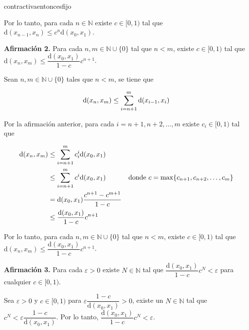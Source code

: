 \documentclass[12pt]{article}
\newenvironment{ejercicio}[1]{\begin{ejer}[breakable, pad at break = 5mm, leftrule = 0.7mm, rightrule = 0.7mm, right = 2mm, left = 2mm, enlarge bottom finally by = 3mm, fontlower = \setlength{\parskip}{2mm}]{}{#1}}{\end{ejer}}
\newcommand{\nat}{\mathbb{N}}
\begin{document}
\begin{ejercicio}{contractivaentoncesfijo}
\begin{minipage}{0.98\linewidth}
			Por lo tanto, para cada $ n \in \nat $ existe $ c \in [0,1) $ tal que $ \mathrm{d} (x_{n-1}, x_n) \leq c^n \mathrm{d} (x_0, x_1) $.
		\end{minipage}

		\textbf{Afirmación 2.} Para cada $ n, m \in \nat \cup \lbrace 0 \rbrace $ tal que $ n < m $, existe $ c \in [0,1) $ tal que $ \mathrm{d} (x_n, x_m) \leq \dfrac{\mathrm{d} (x_0, x_1)}{1-c} c^{n+1} $. 

		\hfill \begin{minipage}{0.98\linewidth}
			\setlength{\parskip}{1mm}

			Sean $ n, m \in \nat \cup \lbrace 0 \rbrace $ tales que $ n < m $, se tiene que

			\begin{equation*}
				\mathrm{d} (x_n, x_m) \leq \sum_{i=n+1}^{m} \mathrm{d} (x_{i-1}, x_i) \\
			\end{equation*}

			Por la afirmación anterior, para cada $ i = n+1, n+2, \ldots, m $ existe $ c_i \in [0,1) $ tal que 
			
			\begin{align*}
				\mathrm{d} (x_n, x_m) &\leq \sum_{i=n+1}^{m} c_i^i \mathrm{d} (x_0, x_1) & \\
				&\leq \sum_{i=n+1}^{m} c^i \mathrm{d} (x_0, x_1) & \mbox{donde $ c = \max \{ c_{n+1}, c_{n+2}, \ldots, c_m \} $} \\
				&= \mathrm{d} (x_0, x_1) \dfrac{c^{n+1}-c^{m+1}}{1-c} & \\
				&\leq \dfrac{\mathrm{d} (x_0, x_1)}{1-c} c^{n+1} &
			\end{align*}

			Por lo tanto, para cada $ n, m \in \nat \cup \lbrace 0 \rbrace $ tal que $ n < m $, existe $ c \in [0,1) $ tal que \\ $ \mathrm{d} (x_n, x_m) \leq \dfrac{\mathrm{d} (x_0, x_1)}{1-c} c^{n+1} $. 
		\end{minipage}

		\textbf{Afirmación 3.} Para cada $ \varepsilon > 0 $ existe $ N \in \nat $ tal que $ \dfrac{\mathrm{d} (x_0, x_1)}{1-c} c^N < \varepsilon $ para cualquier $ c \in [0,1) $. 

		\hfill \begin{minipage}{0.98\linewidth}
			\setlength{\parskip}{1mm}

			Sea $ \varepsilon > 0 $ y $ c \in [0,1) $ para $ \varepsilon \dfrac{1-c}{\mathrm{d} (x_0, x_1)} > 0 $, existe un $ N \in \nat $ tal que $ c^N < \varepsilon \dfrac{1-c}{\mathrm{d} (x_0, x_1)} $. Por lo tanto, $ \dfrac{\mathrm{d} (x_0, x_1)}{1-c} c^N < \varepsilon $. 
		\end{minipage}


\end{ejercicio}
\end{document}
